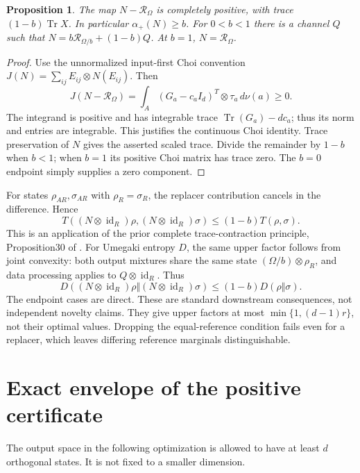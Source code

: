 \documentclass[11pt]{article}
\newtheorem{proposition}[theorem]{Proposition}
\newcommand{\Tr}{\operatorname{Tr}}
\newcommand{\id}{\operatorname{id}}
\newcommand{\R}{\mathcal R}
\begin{document}
\begin{proposition}\label{cp}
The map $N-\R_\Omega$ is completely positive, with trace
$(1-b)\Tr X$. In particular $\alpha_+(N)\ge b$.
For $0<b<1$ there is a channel $Q$ such that
$N=b\R_{\Omega/b}+(1-b)Q$. At $b=1$, $N=\R_\Omega$.
\end{proposition}
\begin{proof}
Use the unnormalized input-first Choi convention
$J(N)=\sum_{ij}E_{ij}\otimes N(E_{ij})$. Then
\[
 J(N-\R_\Omega)=\int_A (G_a-c_aI_d)^T\otimes\tau_a\,d\nu(a)\ge0.
\]
The integrand is positive and has integrable trace
$\Tr(G_a)-dc_a$; thus its norm and entries are integrable. This justifies the continuous Choi identity. Trace preservation of $N$ gives the asserted scaled trace. Divide the remainder by $1-b$ when $b<1$; when $b=1$ its positive Choi matrix has trace zero. The $b=0$ endpoint simply supplies a zero component.
\end{proof}

For states $\rho_{AR},\sigma_{AR}$ with $\rho_R=\sigma_R$, the replacer contribution cancels in the difference. Hence
\begin{equation}\label{trace}
 T((N\otimes\id_R)\rho,(N\otimes\id_R)\sigma)
 \le(1-b)T(\rho,\sigma).
\end{equation}
This is an application of the prior complete trace-contraction principle, Proposition30 of \cite{GHNW}. For Umegaki entropy $D$, the same upper factor follows from joint convexity: both output mixtures share the same state $(\Omega/b)\otimes\rho_R$, and data processing applies to $Q\otimes\id_R$. Thus
\begin{equation}\label{entropy}
 D((N\otimes\id_R)\rho\Vert(N\otimes\id_R)\sigma)
 \le(1-b)D(\rho\Vert\sigma).
\end{equation}
The endpoint cases are direct. These are standard downstream consequences, not independent novelty claims. They give upper factors at most $\min\{1,(d-1)r\}$, not their optimal values. Dropping the equal-reference condition fails even for a replacer, which leaves differing reference marginals distinguishable.

\section{Exact envelope of the positive certificate}
The output space in the following optimization is allowed to have at least $d$ orthogonal states. It is not fixed to a smaller dimension.
\end{document}

